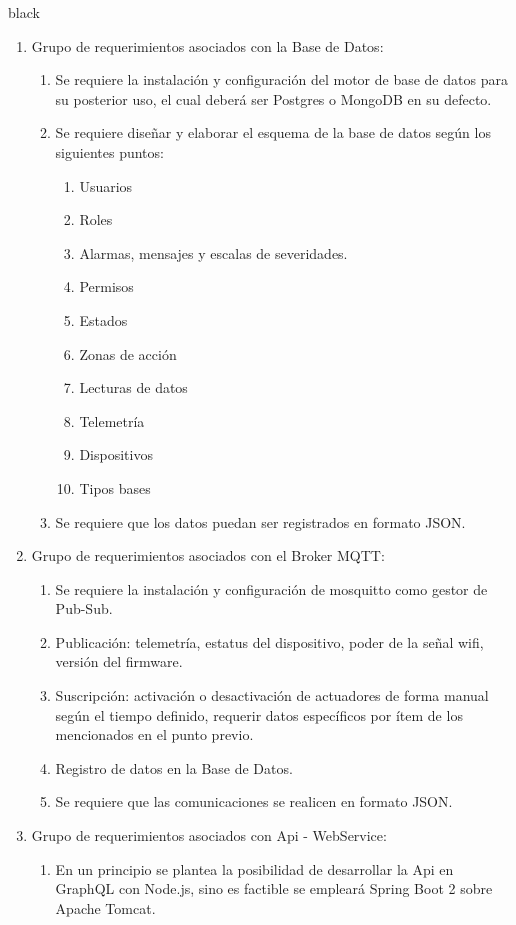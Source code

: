 \documentclass[11pt]{charter}
\begin{document}
\begin{consigna}{black}
\begin{enumerate}
\begin{enumerate}
	\end{enumerate}
\item Grupo de requerimientos asociados con la Base de Datos:
	\begin{enumerate}
		\item Se requiere la instalación y configuración del motor de base de datos para su posterior uso, el cual deberá ser Postgres o MongoDB en su defecto.
		\item Se requiere diseñar y elaborar el esquema de la base de datos según los siguientes puntos:
			\begin{enumerate}
				\item Usuarios
				\item Roles
				\item Alarmas, mensajes y escalas de severidades.
				\item Permisos
				\item Estados
				\item Zonas de acción
				\item Lecturas de datos
				\item Telemetría
				\item Dispositivos
				\item Tipos bases
			\end{enumerate}
		\item Se requiere que los datos puedan ser registrados en formato JSON.
	\end{enumerate}
\item Grupo de requerimientos asociados con el Broker MQTT:
	\begin{enumerate}
		\item Se requiere la instalación y configuración de mosquitto como gestor de Pub-Sub.
		\item Publicación: telemetría, estatus del dispositivo, poder de la señal wifi, versión del firmware.
		\item Suscripción: activación o desactivación de actuadores de forma manual según el tiempo definido, requerir datos específicos por ítem de los mencionados en el punto previo.
		\item Registro de datos en la Base de Datos.
		\item Se requiere que las comunicaciones se realicen en formato JSON.
	\end{enumerate}	
\item Grupo de requerimientos asociados con Api - WebService:
	\begin{enumerate}
		\item En un principio se plantea la posibilidad de desarrollar la Api en GraphQL con Node.js, sino es factible se empleará Spring Boot 2 sobre Apache Tomcat.

\end{enumerate}
\end{enumerate}
\end{consigna}
\end{document}
